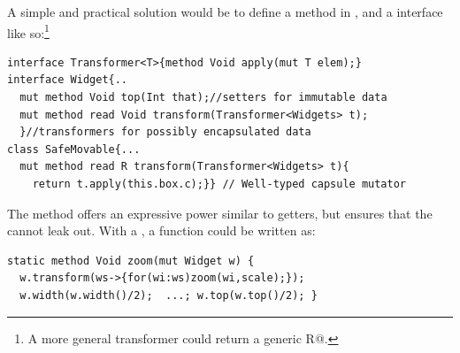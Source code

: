 

A simple and practical solution would be to define a \Q@transform@ method in \Q@Widget@, and a \Q@Transformer@ interface 
like so:\footnote{A more general transformer could return a generic \Q@read R@.}
\saveSpace
\begin{lstlisting}
interface Transformer<T>{method Void apply(mut T elem);}
interface Widget{..
  mut method Void top(Int that);//setters for immutable data
  mut method read Void transform(Transformer<Widgets> t);
  }//transformers for possibly encapsulated data
class SafeMovable{...
  mut method read R transform(Transformer<Widgets> t){
    return t.apply(this.box.c);}} // Well-typed capsule mutator
\end{lstlisting}
The \Q@transform@ method offers an expressive power similar to \Q@mut@ getters, but ensures that the \Q@Widgets@ cannot leak out.  With a \Q@Transformer@, a \Q@zoom@ function could be written as:
\begin{lstlisting}
static method Void zoom(mut Widget w) {
  w.transform(ws->{for(wi:ws)zoom(wi,scale);});
  w.width(w.width()/2);  ...; w.top(w.top()/2); }
\end{lstlisting}


